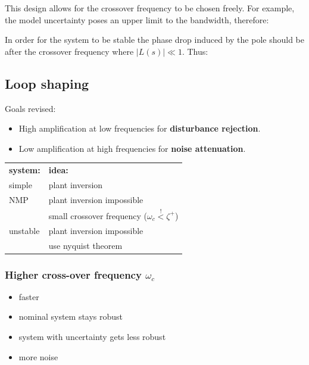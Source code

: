 \documentclass[10pt,a4paper]{scrartcl}
\begin{document}
\begin{multicols*}{3}
	
	This design allows for the crossover frequency to be chosen freely. For example, the model uncertainty poses an upper limit to the bandwidth, therefore:
	
	
	In order for the system to be stable the phase drop induced by the pole should be after the crossover frequency where $|L(s)|\ll 1$. Thus:
	
	
		
	
	\subsection{Loop shaping}
	
	Goals revised:

	\begin{itemize}
	\compaq
	\item
	High amplification at low frequencies for \textbf{disturbance rejection}.
	\item
	Low amplification at high frequencies for \textbf{noise attenuation}.
	\end{itemize}
	
	\begin{center}
	\begin{tabular}{l@{$\quad$}l}
	\textbf{system:} & \textbf{idea:}\\
	simple & plant inversion\\
	\hline
	NMP	&	plant inversion impossible\\
	&small crossover frequency ($\omega_c \overset{!}{<}\zeta^+$)\\
	\hline
	unstable & plant inversion impossible\\
	&use nyquist theorem\\
	\end{tabular}
	\end{center}
	
	\subsubsection{Higher cross-over frequency $\omega_c$}
	
	\begin{itemize}
	\compaq
	\item
	faster
	\item
	nominal system stays robust
	\item
	system with uncertainty gets less robust
	\item
	more noise
	\end{itemize}
	

\end{multicols*}
\end{document}
